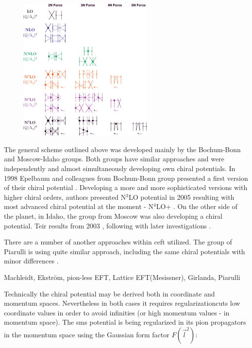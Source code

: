 \begin{figure}[h]
    \begin{center}
    \includegraphics[width=0.6\textwidth]{Figures/chiral.png}
    \end{center}
    \caption{}
    \label{proton_rad}
\end{figure}

The general scheme outlined above was developed mainly by the Bochum-Bonn and Moscow-Idaho groups.
Both groups have similar approaches and were independently and almost simultaneously
developing own chiral potentials. In 1998 Epelbaum and colleagues from Bochum-Bonn group 
presented a first version of their chiral potential \cite{EPELBAOUM1998107, epelbaum2000two}.
Developing a more and more sophisticated versions with higher chiral orders, authors presented
N$^3$LO potential in 2005 \cite{epelbaum2005two} resulting with most advanced chiral potential at the moment - 
N$^4$LO+ \cite{reinkrebs2018}.
On the other side of the planet, in Idaho, the group from Moscow was also developing 
a chiral potential. Teir results from 2003 \cite{Entem2003}, following with later investigations \cite{Machleidt2005, Machleidt2010, Entem2017}.

There are a number of another approaches within \gls{ceft} utilized.
The group of Piarulli is using quite similar approach, including
the same chiral potentials with minor differences \cite{Piarulli2012,Piarulli2015}.

{\color{red} Machleidt, Ekstr\"om, pion-less EFT, Lattice EFT(Mesissner), Girlanda, Piarulli}


Technically the chiral potential may be derived both in coordinate and momentum spaces.
Nevertheless in both cases it requires regularizationcuts 
low coordinate values in order to avoid infinities 
(or high momentum values - in momentum space). 
The \gls{sms} potential is being regularized in its pion propagators
in the momentum space using the Gaussian form factor
$F(\vec{l}^2)$:

